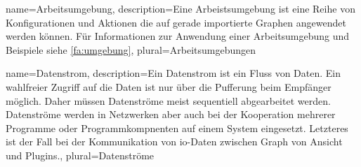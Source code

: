 {
  name=Arbeitsumgebung,
  description={Eine Arbeistsumgebung ist eine Reihe von Konfigurationen und Aktionen die auf gerade importierte Graphen angewendet werden können.
    Für Informationen zur Anwendung einer Arbeitsumgebung und Beispiele siehe \ref{fa:umgebung}},
  plural=Arbeitsumgebungen
}

{
  name=Datenstrom,
  description={Ein Datenstrom ist ein Fluss von Daten. Ein wahlfreier Zugriff auf die Daten ist nur über die Pufferung beim Empfänger möglich. Daher müssen Datenströme meist sequentiell abgearbeitet werden. Datenströme werden in Netzwerken aber auch bei der Kooperation mehrerer Programme oder Programmkompnenten auf einem System eingesetzt. Letzteres ist der Fall bei der Kommunikation von \gls{io}-Daten zwischen Graph von Ansicht und Plugins.},
  plural=Datenströme
}



